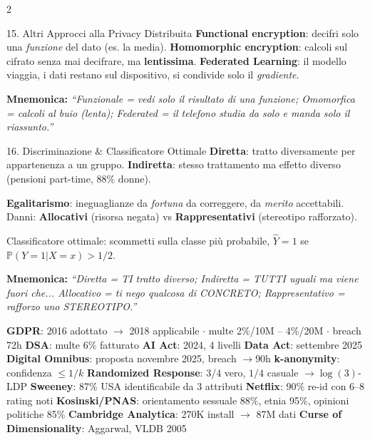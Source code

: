 \documentclass[a4paper,10pt]{article}
\newcommand{\mnem}[1]{{\color{orange!70!black}\textbf{Mnemonica:} \textit{#1}}}
\begin{document}
\begin{multicols}{2}
\begin{area}{15. Altri Approcci alla Privacy Distribuita}
\textbf{Functional encryption}: decifri solo una \emph{funzione} del dato (es. la media). \textbf{Homomorphic encryption}: calcoli sul cifrato senza mai decifrare, ma \textbf{lentissima}. \textbf{Federated Learning}: il modello viaggia, i dati restano sul dispositivo, si condivide solo il \emph{gradiente}.

\mnem{``Funzionale = vedi solo il risultato di una funzione; Omomorfica = calcoli al buio (lenta); Federated = il telefono studia da solo e manda solo il riassunto.''}
\end{area}

\begin{area}{16. Discriminazione \& Classificatore Ottimale}
\textbf{Diretta}: tratto diversamente per appartenenza a un gruppo. \textbf{Indiretta}: stesso trattamento ma effetto diverso (pensioni part-time, 88\% donne).

\textbf{Egalitarismo}: ineguaglianze da \emph{fortuna} da correggere, da \emph{merito} accettabili. Danni: \textbf{Allocativi} (risorsa negata) vs \textbf{Rappresentativi} (stereotipo rafforzato).

Classificatore ottimale: scommetti sulla classe pi\`{u} probabile, $\hat{Y}=1$ se $\mathbb{P}(Y{=}1|X{=}x)>1/2$.

\mnem{``Diretta = TI tratto diverso; Indiretta = TUTTI uguali ma viene fuori che... Allocativo = ti nego qualcosa di CONCRETO; Rappresentativo = rafforzo uno STEREOTIPO.''}
\end{area}

\end{multicols}

\vspace{2pt}
\begin{tcolorbox}[colback=red!4!white, colframe=red!60!black, fonttitle=\bfseries, title={Numeri da non confondere}, boxrule=0.6pt]
\small
\textbf{GDPR}: 2016 adottato $\to$ 2018 applicabile $\cdot$ multe 2\%/10M -- 4\%/20M $\cdot$ breach 72h \quad
\textbf{DSA}: multe 6\% fatturato \quad
\textbf{AI Act}: 2024, 4 livelli \quad
\textbf{Data Act}: settembre 2025 \quad
\textbf{Digital Omnibus}: proposta novembre 2025, breach $\to$90h \quad
\textbf{k-anonymity}: confidenza $\le 1/k$ \quad
\textbf{Randomized Response}: $3/4$ vero, $1/4$ casuale $\to \log(3)$-LDP \quad
\textbf{Sweeney}: 87\% USA identificabile da 3 attributi \quad
\textbf{Netflix}: 90\% re-id con 6--8 rating noti \quad
\textbf{Kosinski/PNAS}: orientamento sessuale 88\%, etnia 95\%, opinioni politiche 85\% \quad
\textbf{Cambridge Analytica}: 270K install $\to$ 87M dati \quad
\textbf{Curse of Dimensionality}: Aggarwal, VLDB 2005
\end{tcolorbox}
\end{document}
